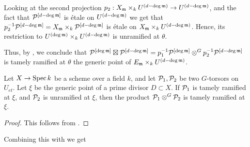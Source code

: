 Looking at the second projection $p_2:X_{\mathfrak{m}} \times_k U^{(d - \deg \mathfrak{m})} \to U^{(d - \deg \mathfrak{m})}$, and the fact that 
$\mathcal{P}^{[d - \deg \mathfrak{m}]}$ is \'etale on $U^{(d - \deg \mathfrak{m})}$ we get that 
$p_2^{-1} \mathcal{P}^{[d - \deg \mathfrak{m}]}= X_{\mathfrak{m}} \times_k \mathcal{P}^{[d - \deg \mathfrak{m}]}$ is \'etale on $X_{\mathfrak{m}} \times_k U^{(d - \deg \mathfrak{m})}$.
Hence, its restriction to $U^{(\deg \mathfrak{m})} \times_k U^{(d - \deg \mathfrak{m})}$ is unramified at $\theta$.

Thus, by , we conclude that ${\mathcal{P}^{[\deg \mathfrak{m}]}} \boxtimes \mathcal{P}^{[d - \deg \mathfrak{m}]} = p_1^{-1} \mathcal{P}^{[\deg \mathfrak{m}]} \otimes^G p_2^{-1} \mathcal{P}^{[d - \deg \mathfrak{m}]}$
     is tamely ramified at $\theta$ the generic point of $E_{\mathfrak{m}} \times_k U^{(d-\deg \mathfrak{m})}$.

\begin{lemma}\label{lemma:tame-times-unramified}
     Let $X \to \operatorname{Spec} k$ be a scheme over a field $k$, and let $\mathcal{P}_1, \mathcal{P}_2$ be two $G$-torsors on $U_{et}$.
     Let $\xi$ be the generic point of a prime divisor $D \subset X$.
     If $\mathcal{P}_1$ is tamely ramified at $\xi$, and $\mathcal{P}_2$ is unramified at $\xi$,
     then the product $\mathcal{P}_1 \otimes^G \mathcal{P}_2$ is tamely ramified at $\xi$.
\end{lemma}
\begin{proof}
     This follows from .
\end{proof}

Combining this with  we get

